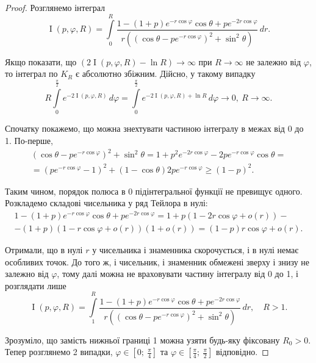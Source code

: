 \begin{lem}
\begin{proof}
Розглянемо інтеграл
\begin{equation*}
\operatorname{I}(p, \varphi, R) = \int\limits_{0}^{R} \frac{1- (1+p)e^{-r \cos \varphi} \cos \theta + p e^{-2r \cos \varphi} }{r((\cos \theta - pe^{-r\cos \varphi})^{2} + \sin^2 \theta)}\,dr.
\end{equation*}

Якщо показати, що $(2\operatorname{I}(p, \varphi, R) - \ln R) \rightarrow \infty$ при $R \rightarrow \infty$ не залежно від $\varphi$, то інтеграл по $K_{R}$ є абсолютно збіжним. Дійсно, у такому випадку
\begin{equation*}
R \int\limits_{0}^{\frac{\pi}{2}} e^{-2\operatorname{I}(p, \varphi, R) }\, d\varphi = \int\limits_{0}^{\frac{\pi}{2}} e^{-2\operatorname{I}(p, \varphi, R) + \ln R}\, d\varphi \rightarrow 0, ~R \rightarrow \infty.
\end{equation*}

Спочатку покажемо, що можна знехтувати частиною інтегралу в межах від 0 до 1. По-перше,
\begin{gather*}
(\cos \theta - pe^{-r\cos \varphi})^{2} + \sin^2 \theta = 1 + p^2 e^{-2r \cos\varphi} - 2p e^{-r \cos\varphi} \cos\theta = \\
= (p e^{-r \cos\varphi} -1)^2 + (1 - \cos\theta) 2p e^{-r \cos\varphi} \geq (1-p)^2.
\end{gather*}

Таким чином, порядок полюса в 0 підінтегральної функції не превищує одного. Розкладемо складові чисельника у ряд Тейлора в нулі:
\begin{gather*}
1- (1+p)e^{-r \cos \varphi} \cos \theta + p e^{-2r \cos \varphi} = 1 + p(1 - 2r\cos\varphi + o(r))  -\\
 -(1 + p)(1 - r \cos\varphi + o(r))(1 + o(r)) = (1 - p) r \cos\varphi + o(r).
\end{gather*}

Отримали, що в нулі $r$ у чисельника і знаменника скорочується, і в нулі немає особливих точок. До того ж, і чисельник, і знаменник обмежені зверху і знизу не залежно від $\varphi$, тому далі можна не враховувати частину інтегралу від 0 до 1, і розглядати лише
\begin{equation*}
\operatorname{I}(p, \varphi, R) = \int\limits_{1}^{R} \frac{1- (1+p)e^{-r \cos \varphi} \cos \theta + p e^{-2r \cos \varphi} }{r((\cos \theta - pe^{-r\cos \varphi})^{2} + \sin^2 \theta)}\,dr, \quad R > 1.
\end{equation*}

Зрозуміло, що замість нижньої границі 1 можна узяти будь-яку фіксовану $R_{0} > 0$. Тепер розглянемо 2 випадки, $\varphi \in [0;~\frac{\pi}{4}]$ та  $\varphi \in [\frac{\pi}{4};~\frac{\pi}{2}]$ відповідно.


\end{proof}
\end{lem}
